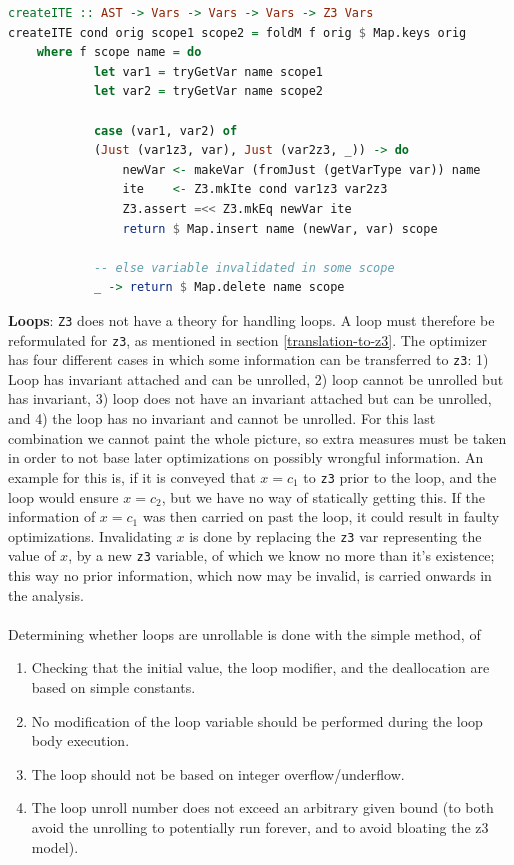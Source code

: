 \begin{lstlisting}[language=Haskell, label=listing:ite, caption=Using \lsin{mkIte}.]
createITE :: AST -> Vars -> Vars -> Vars -> Z3 Vars
createITE cond orig scope1 scope2 = foldM f orig $ Map.keys orig
    where f scope name = do
            let var1 = tryGetVar name scope1
            let var2 = tryGetVar name scope2

            case (var1, var2) of
            (Just (var1z3, var), Just (var2z3, _)) -> do
                newVar <- makeVar (fromJust (getVarType var)) name
                ite    <- Z3.mkIte cond var1z3 var2z3
                Z3.assert =<< Z3.mkEq newVar ite
                return $ Map.insert name (newVar, var) scope

            -- else variable invalidated in some scope
            _ -> return $ Map.delete name scope
\end{lstlisting}
\noindent
\textbf{Loops}:
\texttt{Z3} does not have a theory for handling loops. A loop must therefore be
reformulated for \texttt{z3}, as mentioned in section \ref{translation-to-z3}. The optimizer
has four different cases in which some information can be transferred to \texttt{z3}: 1)
Loop has invariant attached and can be unrolled, 2) loop cannot be unrolled but has invariant,
3) loop does not have an invariant attached but can be unrolled, and 4) the loop has no invariant
and cannot be unrolled. For this last combination we cannot paint the whole picture, so extra
measures must be taken in order to not base later optimizations on possibly wrongful information.
An example for this is, if it is conveyed that $x = c_1$ to \texttt{z3}
prior to the loop, and the loop would ensure $x=c_2$, but we have no way of statically getting this.
If the information of $x=c_1$ was then carried on past the loop, it could result in faulty
optimizations. Invalidating $x$ is done by replacing the \texttt{z3} var representing the value
of $x$, by a new \texttt{z3} variable, of which we know no more than it's existence; this way
no prior information, which now may be invalid, is carried onwards in the analysis.
\\
\\
Determining whether loops are unrollable is done with the simple method, of 
\begin{enumerate}
    \item Checking that the initial value, the loop modifier, and the deallocation are based on
          simple constants.

    \item No modification of the loop variable should be performed during the loop body execution.

    \item The loop should not be based on integer overflow/underflow.

    \item The loop unroll number does not exceed an arbitrary given bound (to both avoid the
          unrolling to potentially run forever, and to avoid bloating the z3 model).
\end{enumerate}
